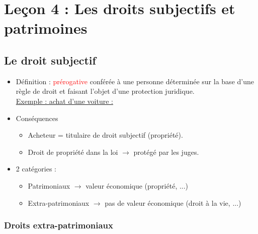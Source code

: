 \newpage
\chapter{Leçon 4 : Les droits subjectifs et patrimoines}

\section{Le droit subjectif}

\begin{itemize}
    \item Définition : \textcolor{red}{prérogative} conférée à une personne déterminée sur la base d'une règle de droit et faisant l'objet d'une protection juridique. \\
    \underline{Exemple : achat d'une voiture :}
	\item Conséquences
    \begin{itemize}
        \item Acheteur = titulaire de droit subjectif (propriété).
        \item Droit de propriété dans la loi $\rightarrow$ protégé par les juges.
    \end{itemize}
    \item 2 catégories :
    \begin{itemize}
        \item Patrimoniaux $\rightarrow$ valeur économique (propriété, ...)
        \item Extra-patrimoniaux $\rightarrow$ pas de valeur économique (droit à la vie, ...)
    \end{itemize}
\end{itemize}

\subsection{Droits extra-patrimoniaux}

